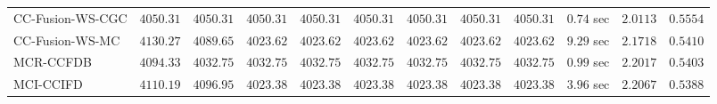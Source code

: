 \begin{table}[H]
\begin{tabular}{lrrrrrrrrrrr}
    CC-Fusion-WS-CGC & $      4050.31$ & $      4050.31$ & $      4050.31$ & $      4050.31$ & $      4050.31$ & $      4050.31$ & $      4050.31$ & $      4050.31$ & $         0.74$ sec    & $       2.0113$  & $       0.5554$ \\ 
     CC-Fusion-WS-MC & $      4130.27$ & $      4089.65$ & $      4023.62$ & $      4023.62$ & $      4023.62$ & $      4023.62$ & $      4023.62$ & $      4023.62$ & $         9.29$ sec    & $       2.1718$  & $       0.5410$ \\ 
\cmidrule{1-1} 
           MCR-CCFDB & $      4094.33$ & $      4032.75$ & $      4032.75$ & $      4032.75$ & $      4032.75$ & $      4032.75$ & $      4032.75$ & $      4032.75$ & $         0.99$ sec    & $       2.2017$  & $       0.5403$ \\ 
\cmidrule{1-1} 
           MCI-CCIFD & $      4110.19$ & $      4096.95$ & $      4023.38$ & $      4023.38$ & $      4023.38$ & $      4023.38$ & $      4023.38$ & $      4023.38$ & $         3.96$ sec    & $       2.2067$  & $       0.5388$ \\ 
\bottomrule
\end{tabular}
\end{table}

